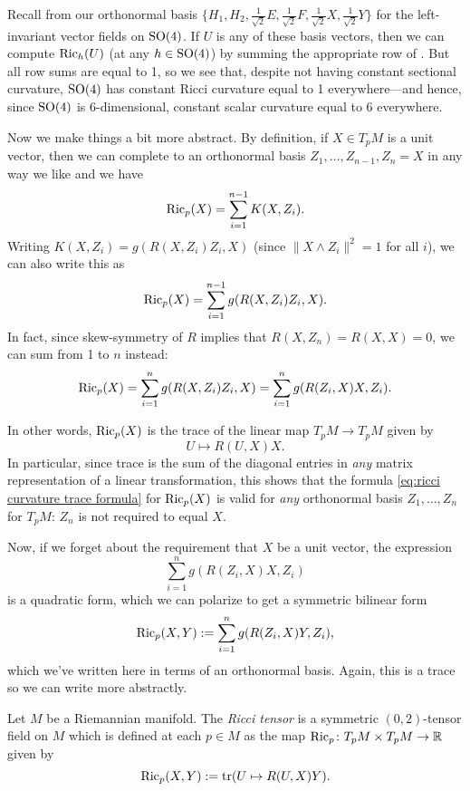 \begin{example}
	Recall from  our orthonormal basis $\{H_1,H_2, \frac{1}{\sqrt{2}}E, \frac{1}{\sqrt{2}}F,\frac{1}{\sqrt{2}}X,\frac{1}{\sqrt{2}}Y\}$ for the left-invariant vector fields on $\operatorname{SO}(4)$. If $U$ is any of these basis vectors, then we can compute $\operatorname{Ric}_h(U)$ (at any $h \in \operatorname{SO}(4)$) by summing the appropriate row of . But all row sums are equal to 1, so we see that, despite not having constant sectional curvature, $\operatorname{SO}(4)$ has constant Ricci curvature equal to 1 everywhere—and hence, since $\operatorname{SO}(4)$ is 6-dimensional, constant scalar curvature equal to 6 everywhere.
\end{example}

Now we make things a bit more abstract. By definition, if $X \in T_pM$ is a unit vector, then we can complete to an orthonormal basis $Z_1, \dots , Z_{n-1}, Z_n = X$ in any way we like and we have
\[
	\operatorname{Ric}_p(X) = \sum_{i=1}^{n-1} K(X,Z_i).
\]
Writing $K(X,Z_i) = g(R(X,Z_i)Z_i,X)$ (since $\|X \wedge Z_i\|^2=1$ for all $i$), we can also write this as
\[
	\operatorname{Ric}_p(X) = \sum_{i=1}^{n-1} g(R(X,Z_i)Z_i,X).
\]
In fact, since skew-symmetry of $R$ implies that $R(X,Z_n) = R(X,X) = 0$, we can sum from 1 to $n$ instead:
\begin{equation}\label{eq:ricci curvature trace formula}
	\operatorname{Ric}_p(X) = \sum_{i=1}^n g(R(X,Z_i)Z_i,X) = \sum_{i=1}^n g(R(Z_i,X)X,Z_i).
\end{equation}

In other words, $\operatorname{Ric}_p(X)$ is the trace of the linear map $T_p M \to T_p M$ given by
\[
	U \mapsto R(U,X)X.
\]
In particular, since trace is the sum of the diagonal entries in \emph{any} matrix representation of a linear transformation, this shows that the formula \eqref{eq:ricci curvature trace formula} for $\operatorname{Ric}_p(X)$ is valid for \emph{any} orthonormal basis $Z_1, \dots , Z_n$ for $T_pM$: $Z_n$ is not required to equal $X$.

Now, if we forget about the requirement that $X$ be a unit vector, the expression
\[
	\sum_{i=1}^n g(R(Z_i,X)X,Z_i)
\]
is a quadratic form, which we can polarize to get a symmetric bilinear form
\[
	\operatorname{Ric}_p(X,Y) := \sum_{i=1}^n g(R(Z_i,X)Y,Z_i),
\]
which we've written here in terms of an orthonormal basis. Again, this is a trace so we can write more abstractly.

\begin{definition}\label{def:Ricci tensor}
	Let $M$ be a Riemannian manifold. The \emph{Ricci tensor} is a symmetric $(0,2)$-tensor field on $M$ which is defined at each $p \in M$ as the map $\operatorname{Ric}_p \colon\thinspace\! T_pM \times T_pM \to \mathbb{R}$ given by
	\[
		\operatorname{Ric}_p(X,Y) := \operatorname{tr}(U \mapsto R(U,X)Y).
	\]
\end{definition}


